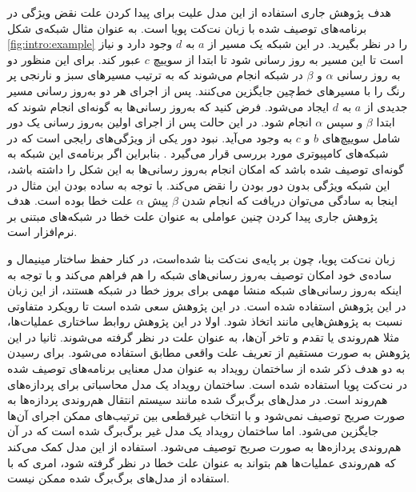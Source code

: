  هدف پژوهش جاری استفاده از این مدل علیت برای پیدا کردن علت نقض 
ویژگی در برنامه‌های توصیف شده با زبان نت‌کت پویا است.
به عنوان مثال شبکه‌ی شکل 
\ref{fig:intro:example}
را در نظر بگیرید.
در این شبکه یک مسیر از 
$a$
به 
$d$
وجود دارد و نیاز است تا این مسیر به روز رسانی شود تا ابتدا از سوییچ 
$c$
عبور کند. 
برای این منظور دو به روز رسانی 
$\alpha$
و
$\beta$
در شبکه انجام می‌شوند که به ترتیب مسیرهای سبز و نارنجی پر رنگ را با مسیر‌های خط‌چین جایگزین می‌کنند.
پس از اجرای هر دو به‌روز رسانی مسیر جدیدی از 
$a$
به 
$d$
ایجاد می‌شود.
فرض کنید که به‌روز رسانی‌ها به گونه‌ای انجام شوند که ابتدا 
$\beta$
و سپس
$\alpha$
انجام شود. 
در این حالت پس از اجرای اولین به‌روز رسانی یک دور%
شامل سوییچ‌های 
$b$
و 
$c$
به وجود می‌آید.
نبود دور یکی از ویژگی‌های رایجی است که در شبکه‌های کامپیوتری مورد بررسی قرار می‌گیرد
\cite{network-abstractions}.
بنابراین اگر برنامه‌ی این شبکه به گونه‌ای توصیف شده باشد که امکان انجام به‌روز رسانی‌ها به این شکل را داشته باشد، این شبکه ویژگی بدون دور بودن را نقض می‌کند.
با توجه به ساده بودن این مثال در اینجا به سادگی می‌توان دریافت که انجام شدن 
$\beta$
پیش 
$\alpha$
علت خطا بوده است.
هدف پژوهش جاری پیدا کردن چنین عواملی به عنوان علت خطا در شبکه‌های مبتنی بر نرم‌افزار است.

زبان نت‌کت پویا، چون بر پایه‌ی نت‌کت بنا شده‌است،
در کنار حفظ ساختار مینیمال و ساده‌ی خود امکان توصیف به‌روز رسانی‌های شبکه‌ را هم فراهم می‌کند
و با توجه به اینکه به‌روز رسانی‌های شبکه منشا مهمی برای بروز خطا در شبکه هستند، از این زبان در این پژوهش استفاده شده است.
در این پژوهش سعی شده است تا رویکرد متفاوتی نسبت به پژوهش‌هایی مانند
\cite{causality-checking,causal-hml,decomposing}
اتخاذ شود.
اولا در این پژوهش روابط ساختاری عملیات‌ها،
مثلا هم‌روندی یا تقدم و تاخر آن‌ها، به عنوان علت در نظر گرفته می‌شوند.
ثانیا در این پژوهش به صورت مستقیم از تعریف علت واقعی مطابق
\cite{hp}
استفاده می‌شود.
برای رسیدن به دو هدف ذکر شده از ساختمان رویداد%
 \cite{es}
به عنوان مدل معنایی برنامه‌های توصیف شده در نت‌کت پویا استفاده شده است.
ساختمان رویداد یک مدل محاسباتی%
برای پردازه‌های هم‌روند است.
در مدل‌های برگ‌برگ شده%
مانند سیستم انتقال%
هم‌روندی پردازه‌ها به صورت صریح توصیف نمی‌شود و با انتخاب غیرقطعی%
بین ترتیب‌های ممکن اجرای آن‌ها جایگزین می‌شود.
اما ساختمان رویداد یک مدل غیر برگ‌برگ شده%
 است که در آن هم‌روندی پردازه‌ها به صورت صریح توصیف می‌شود.
استفاده از این مدل کمک می‌کند که هم‌روندی عملیات‌ها هم بتواند به عنوان علت خطا در نظر گرفته شود، امری که با استفاده از مدل‌های برگ‌برگ شده ممکن نیست. 

